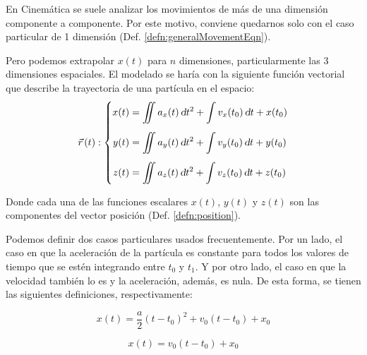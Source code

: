 En Cinemática se suele analizar los movimientos de más de una dimensión componente a componente.
Por este motivo, conviene quedarnos solo con el caso particular de 1 dimensión (Def. \ref{defn:generalMovementEqn}).

Pero podemos extrapolar $x(t)$ para $n$ dimensiones, particularmente las 3 dimensiones espaciales.
El modelado se haría con la siguiente función vectorial que describe la trayectoria de una partícula en el espacio:
\[
  \vec{r}\hspace{0.05cm}(t) :
  \left\{
    \begin{aligned}
      x(t) &= \displaystyle\iint a_x(t) \, \textsl{d} t^2 + \displaystyle\int v_x(t_0) \, \textsl{d} t + x(t_0)
      \\[1ex]
      y(t) &= \displaystyle\iint a_y(t) \, \textsl{d} t^2 + \displaystyle\int v_y(t_0) \, \textsl{d} t + y(t_0)
      \\[1ex]
      z(t) &= \displaystyle\iint a_z(t) \, \textsl{d} t^2 + \displaystyle\int v_z(t_0) \, \textsl{d} t + z(t_0)
    \end{aligned}
  \right.
\]

Donde cada una de las funciones escalares $x(t)$, $y(t)$ y $z(t)$ son las componentes del vector posición (Def. \ref{defn:position}).

Podemos definir dos casos particulares usados frecuentemente.
Por un lado, el caso en que la aceleración de la partícula es constante para todos los valores de tiempo que se estén integrando entre $t_0$ y $t_1$.
Y por otro lado, el caso en que la velocidad también lo es y la aceleración, además, es nula.
De esta forma, se tienen las siguientes definiciones, respectivamente:

\begin{mdframed}[style=DefinitionFrame]
    \begin{defn}
        \label{defn:cstAccelMovementEqn}
    \end{defn}
    \begin{equation*}
        x(t) = \dfrac{a}{2}(t-t_0)^2 + v_0(t-t_0) + x_0
    \end{equation*}
\end{mdframed}

\begin{mdframed}[style=DefinitionFrame]
    \begin{defn}
        \label{defn:cstVelMovementEqn}
    \end{defn}
    \begin{equation*}
        x(t) = v_0(t-t_0) + x_0
    \end{equation*}
\end{mdframed}


